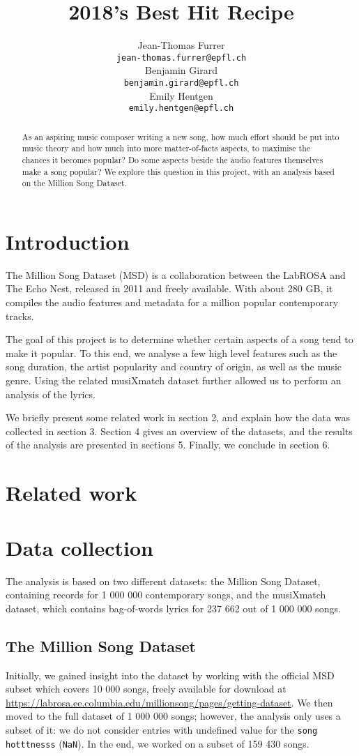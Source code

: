 \documentclass[11pt]{article}
\title{2018's Best Hit Recipe}
\author{Jean-Thomas Furrer \\
  {\small\tt jean-thomas.furrer@epfl.ch} \\\And
  Benjamin Girard \\
  {\small\tt benjamin.girard@epfl.ch} \\\And
  Emily Hentgen \\
{\small\tt emily.hentgen@epfl.ch} \\}
\date{}
\renewcommand\_{\textunderscore\allowbreak}
\begin{document}
\maketitle
\begin{abstract}


As an aspiring music composer writing a new song, how much effort should be put into music theory and how much into more matter-of-facts aspects, to maximise the chances it becomes popular?
Do some aspects beside the audio features themselves make a song popular?
We explore this question in this project, with an analysis based on the Million Song Dataset.
\end{abstract}


\section{Introduction}
The Million Song Dataset (MSD) is a collaboration between the LabROSA and The Echo Nest, released in 2011 and freely available.
With about 280 GB, it compiles the audio features and metadata for a million popular contemporary tracks. 

The goal of this project is to determine whether certain aspects of a song tend to make it popular.
To this end, we analyse a few high level features such as the song duration, the artist popularity and country of origin, as well as the music genre. 
Using the related musiXmatch dataset further allowed us to perform an analysis of the lyrics.

We briefly present some related work in section 2, and explain how the data was collected in section 3. Section 4 gives an overview of the datasets, and the results of the analysis are presented in sections 5. Finally, we conclude in section 6.

\section{Related work}

\section{Data collection}
The analysis is based on two different datasets: the Million Song Dataset, containing records for 1 000 000 contemporary songs, and the musiXmatch dataset, which contains bag-of-words lyrics for 237 662 out of 1 000 000 songs.

\subsection{The Million Song Dataset}
Initially, we gained insight into the dataset by working with the official MSD subset which covers 10 000 songs, freely available for download at \url{https://labrosa.ee.columbia.edu/millionsong/pages/getting-dataset}.
We then moved to the full dataset of 1 000 000 songs; however, the analysis only uses a subset of it: we do not consider entries with undefined value for the \texttt{song hotttnesss} (\texttt{NaN}).
In the end, we worked on a subset of 159 430 songs.
\end{document}
